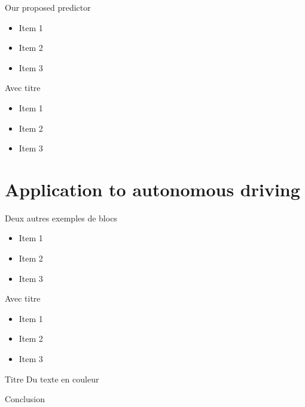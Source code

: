\documentclass[slideopt,A4,showboxes,svgnames]{beamer}
\begin{document}
\begin{frame}{Our proposed predictor}
    \begin{alertblock}{}
 \begin{itemize}
    \item{Item 1 }
    \item {Item 2}
    \item {Item 3}
    \end{itemize}
  \end{alertblock}
      \begin{alertblock}{Avec titre}
 \begin{itemize}
    \item{Item 1 }
    \item {Item 2}
    \item {Item 3}
    \end{itemize}
  \end{alertblock}
\end{frame}

\section{Application to autonomous driving}
 \frame{\sectionpage}

\begin{frame}{Deux autres exemples de blocs}
    \begin{exampleblock}{}
 \begin{itemize}
    \item{Item 1 }
    \item {Item 2}
    \item {Item 3}
    \end{itemize}
  \end{exampleblock}
      \begin{exampleblock}{Avec titre}
 \begin{itemize}
    \item{Item 1 }
    \item {Item 2}
    \item {Item 3}
    \end{itemize}
  \end{exampleblock}
\end{frame}
\begin{frame}{Titre}
Du \textcolor{gris_fonce_inria}{texte}  {en}  \textcolor{rouge_inria}{couleur} 
\end{frame}
\begin{frame}{Conclusion}
 
\end{frame}
\end{document}
